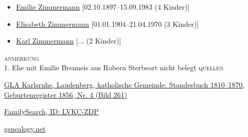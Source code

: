 \begin{person}[
    surname = {Zimmermann},
    givenname = {Valentin},
    suffix = {1856--1923},
    label = {@I392@}
    ]
\begin{itemize}
\item \hyperref[@I967@]{Emilie Zimmermann} [02.10.1897--15.09.1983 (4 Kinder)]
\item \hyperref[@I966@]{Elisabeth Zimmermann} [01.01.1904--21.04.1970 (3 Kinder)]
\item \hyperref[@I969@]{Karl Zimmermann} [... (2 Kinder)]
\end{itemize}
\medbreak
\textsc{anmerkung}\\
1. Ehe mit Emilie Brenneis aus Robern
Sterbeort nicht belegt
\medbreak
\textsc{{quellen}}
\begin{enumerate}[label={[\arabic*]}]
\item \href{http://www.landesarchiv-bw.de/plink/?f=4-1119439-261}{GLA Karlsruhe, Laudenberg, katholische Gemeinde: Standesbuch 1810–1870, Geburtenregister 1856, Nr. 4 (Bild 261)}
\item \href{https://www.familysearch.org/tree/person/details/LVKC-ZDP}{FamilySearch, ID: LVKC-ZDP}
\item \href{http://gedbas.genealogy.net/person/show/1172964972}{genealogy.net}
\end{enumerate}

\end{person}

